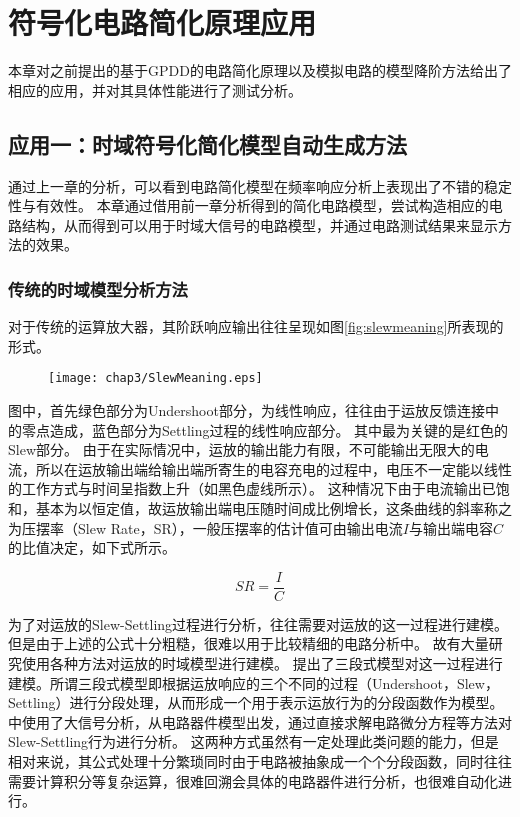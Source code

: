 \chapter{符号化电路简化原理应用}
\label{chap:application}

本章对之前提出的基于GPDD的电路简化原理以及模拟电路的模型降阶方法给出了相应的应用，并对其具体性能进行了测试分析。

\section{应用一：时域符号化简化模型自动生成方法}

通过上一章的分析，可以看到电路简化模型在频率响应分析上表现出了不错的稳定性与有效性。
本章通过借用前一章分析得到的简化电路模型，尝试构造相应的电路结构，从而得到可以用于时域大信号的电路模型，并通过电路测试结果来显示方法的效果。

\subsection{传统的时域模型分析方法}

对于传统的运算放大器，其阶跃响应输出往往呈现如图\ref{fig:slewmeaning}所表现的形式。

\begin{figure}[!htp]
	\centering
	\texttt{[image: chap3/SlewMeaning.eps]}
\end{figure}

图中，首先绿色部分为Undershoot部分，为线性响应，往往由于运放反馈连接中的零点造成，蓝色部分为Settling过程的线性响应部分。
其中最为关键的是红色的Slew部分。
由于在实际情况中，运放的输出能力有限，不可能输出无限大的电流，所以在运放输出端给输出端所寄生的电容充电的过程中，电压不一定能以线性的工作方式与时间呈指数上升（如黑色虚线所示）。
这种情况下由于电流输出已饱和，基本为以恒定值，故运放输出端电压随时间成比例增长，这条曲线的斜率称之为压摆率（Slew Rate，SR），一般压摆率的估计值可由输出电流$I$与输出端电容$C$的比值决定，如下式所示。

\begin{equation}
	SR = \frac{I}{C}
\end{equation}

为了对运放的Slew-Settling过程进行分析，往往需要对运放的这一过程进行建模。
但是由于上述的公式十分粗糙，很难以用于比较精细的电路分析中。
故有大量研究使用各种方法对运放的时域模型进行建模。
\parencite{Pug-3Segment-2010}提出了三段式模型对这一过程进行建模。所谓三段式模型即根据运放响应的三个不同的过程（Undershoot，Slew，Settling）进行分段处理，从而形成一个用于表示运放行为的分段函数作为模型。
\parencite{Yavari-TSSlew-2005,Rezaee-FCSlew-2009}中使用了大信号分析，从电路器件模型出发，通过直接求解电路微分方程等方法对Slew-Settling行为进行分析。
这两种方式虽然有一定处理此类问题的能力，但是相对来说，其公式处理十分繁琐同时由于电路被抽象成一个个分段函数，同时往往需要计算积分等复杂运算，很难回溯会具体的电路器件进行分析，也很难自动化进行。

